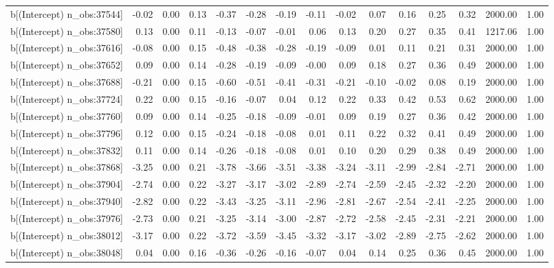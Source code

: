 \begin{table}[ht]
\begin{tabular}{rrrrrrrrrrrrrrr}
  b[(Intercept) n\_obs:37544] & -0.02 & 0.00 & 0.13 & -0.37 & -0.28 & -0.19 & -0.11 & -0.02 & 0.07 & 0.16 & 0.25 & 0.32 & 2000.00 & 1.00 \\ 
  b[(Intercept) n\_obs:37580] & 0.13 & 0.00 & 0.11 & -0.13 & -0.07 & -0.01 & 0.06 & 0.13 & 0.20 & 0.27 & 0.35 & 0.41 & 1217.06 & 1.00 \\ 
  b[(Intercept) n\_obs:37616] & -0.08 & 0.00 & 0.15 & -0.48 & -0.38 & -0.28 & -0.19 & -0.09 & 0.01 & 0.11 & 0.21 & 0.31 & 2000.00 & 1.00 \\ 
  b[(Intercept) n\_obs:37652] & 0.09 & 0.00 & 0.14 & -0.28 & -0.19 & -0.09 & -0.00 & 0.09 & 0.18 & 0.27 & 0.36 & 0.49 & 2000.00 & 1.00 \\ 
  b[(Intercept) n\_obs:37688] & -0.21 & 0.00 & 0.15 & -0.60 & -0.51 & -0.41 & -0.31 & -0.21 & -0.10 & -0.02 & 0.08 & 0.19 & 2000.00 & 1.00 \\ 
  b[(Intercept) n\_obs:37724] & 0.22 & 0.00 & 0.15 & -0.16 & -0.07 & 0.04 & 0.12 & 0.22 & 0.33 & 0.42 & 0.53 & 0.62 & 2000.00 & 1.00 \\ 
  b[(Intercept) n\_obs:37760] & 0.09 & 0.00 & 0.14 & -0.25 & -0.18 & -0.09 & -0.01 & 0.09 & 0.19 & 0.27 & 0.36 & 0.42 & 2000.00 & 1.00 \\ 
  b[(Intercept) n\_obs:37796] & 0.12 & 0.00 & 0.15 & -0.24 & -0.18 & -0.08 & 0.01 & 0.11 & 0.22 & 0.32 & 0.41 & 0.49 & 2000.00 & 1.00 \\ 
  b[(Intercept) n\_obs:37832] & 0.11 & 0.00 & 0.14 & -0.26 & -0.18 & -0.08 & 0.01 & 0.10 & 0.20 & 0.29 & 0.38 & 0.49 & 2000.00 & 1.00 \\ 
  b[(Intercept) n\_obs:37868] & -3.25 & 0.00 & 0.21 & -3.78 & -3.66 & -3.51 & -3.38 & -3.24 & -3.11 & -2.99 & -2.84 & -2.71 & 2000.00 & 1.00 \\ 
  b[(Intercept) n\_obs:37904] & -2.74 & 0.00 & 0.22 & -3.27 & -3.17 & -3.02 & -2.89 & -2.74 & -2.59 & -2.45 & -2.32 & -2.20 & 2000.00 & 1.00 \\ 
  b[(Intercept) n\_obs:37940] & -2.82 & 0.00 & 0.22 & -3.43 & -3.25 & -3.11 & -2.96 & -2.81 & -2.67 & -2.54 & -2.41 & -2.25 & 2000.00 & 1.00 \\ 
  b[(Intercept) n\_obs:37976] & -2.73 & 0.00 & 0.21 & -3.25 & -3.14 & -3.00 & -2.87 & -2.72 & -2.58 & -2.45 & -2.31 & -2.21 & 2000.00 & 1.00 \\ 
  b[(Intercept) n\_obs:38012] & -3.17 & 0.00 & 0.22 & -3.72 & -3.59 & -3.45 & -3.32 & -3.17 & -3.02 & -2.89 & -2.75 & -2.62 & 2000.00 & 1.00 \\ 
  b[(Intercept) n\_obs:38048] & 0.04 & 0.00 & 0.16 & -0.36 & -0.26 & -0.16 & -0.07 & 0.04 & 0.14 & 0.25 & 0.36 & 0.45 & 2000.00 & 1.00 \\ 

\end{tabular}
\end{table}
